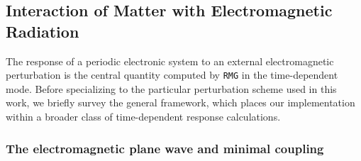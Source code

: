 

\subsection{Interaction of Matter with Electromagnetic Radiation}
\label{sec:em-interaction}

The response of a periodic electronic system to an external
electromagnetic perturbation is the central quantity computed by
\texttt{RMG} in the time-dependent mode.
Before specializing to the particular perturbation scheme used in
this work, we briefly survey the general framework, which places
our implementation within a broader class of time-dependent
response calculations.

\subsubsection{The electromagnetic plane wave and minimal coupling}
\label{sec:plane-wave}

